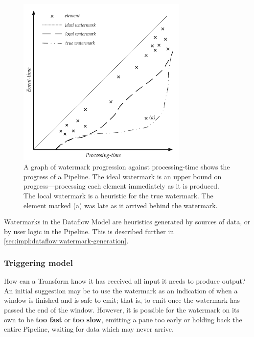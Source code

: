 \begin{figure}
\centering
	\includegraphics[width=0.75\textwidth]{images/diags/watermark-progression-example}
	\caption[An example of a watermark progression plotted against processing-time, showing late data as falling behind the watermark.]{A graph of watermark progression against processing-time shows the progress of a Pipeline. The ideal watermark is an upper bound on progress---processing each element immediately as it is produced. The local watermark is a heuristic for the true watermark. The element marked (a) was late as it arrived behind the watermark.}
	\label{fig:prep:watermark-progression}
\end{figure}

Watermarks in the Dataflow Model are heuristics generated by sources of data, or by user logic in the Pipeline.
This is described further in \cref{sec:impl:dataflow:watermark-generation}.

\subsubsection{Triggering model}

How can a Transform know it has received all input it needs to produce output?
An initial suggestion may be to use the watermark as an indication of when a window is finished and is safe to emit; that is, to emit once the watermark has passed the end of the window.
However, it is possible for the watermark on its own to be \textbf{too fast} or \textbf{too slow}, emitting a pane too early or holding back the entire Pipeline, waiting for data which may never arrive.

